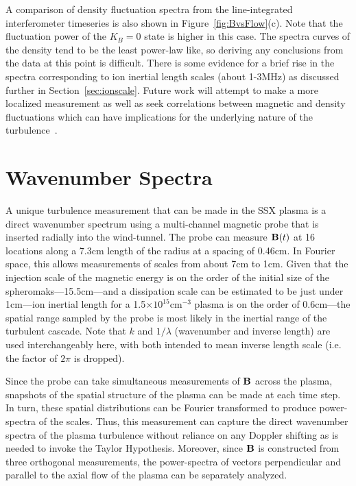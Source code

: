 \documentclass[manuscript]{aastex}
\begin{document}
A comparison of density fluctuation spectra from the line-integrated interferometer timeseries is also shown in Figure~\ref{fig:BvsFlow}(c). Note that the fluctuation power of the $K_{B}=0$ state is higher in this case. The spectra curves of the density tend to be the least power-law like, so deriving any conclusions from the data at this point is difficult. There is some evidence for a brief rise in the spectra corresponding to ion inertial length scales (about 1-3MHz) as discussed further in Section~\ref{sec:ionscale}. Future work will attempt to make a more localized measurement as well as seek correlations between magnetic and density fluctuations which can have implications for the underlying nature of the turbulence~\citep{kle12}.

\section{Wavenumber Spectra}\label{sec:wavenumber}

A unique turbulence measurement that can be made in the SSX plasma is a direct wavenumber spectrum using a multi-channel magnetic probe that is inserted radially into the wind-tunnel. The probe can measure ${\bf B}(t)$ at 16 locations along a 7.3cm length of the radius at a spacing of 0.46cm. In Fourier space, this allows measurements of scales from about 7cm to 1cm. Given that the injection scale of the magnetic energy is on the order of the initial size of the spheromaks---15.5cm---and a dissipation scale can be estimated to be just under 1cm---ion inertial length for a 1.5$\times 10^{15}$cm$^{-3}$ plasma is on the order of 0.6cm---the spatial range sampled by the probe is most likely in the inertial range of the turbulent cascade. Note that $k$ and $1/\lambda$ (wavenumber and inverse length) are used interchangeably here, with both intended to mean inverse length scale (i.e. the factor of $2\pi$ is dropped).

Since the probe can take simultaneous measurements of ${\bf B}$ across the plasma, snapshots of the spatial structure of the plasma can be made at each time step. In turn, these spatial distributions can be Fourier transformed to produce power-spectra of the scales. Thus, this measurement can capture the direct wavenumber spectra of the plasma turbulence without reliance on any Doppler shifting as is needed to invoke the Taylor Hypothesis. Moreover, since ${\bf B}$ is constructed from three orthogonal measurements, the power-spectra of vectors perpendicular and parallel to the axial flow of the plasma can be separately analyzed. 
\end{document}
